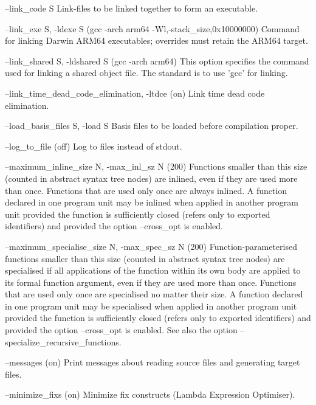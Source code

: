 \documentclass[12pt]{book}
\begin{document}
\begin{scriptcode}
--link_code S
     Link-files to be linked together to form an
     executable.

--link_exe S, -ldexe S (gcc -arch arm64 -Wl,-stack_size,0x10000000)
     Command for linking Darwin ARM64 executables; overrides
     must retain the ARM64 target.

--link_shared S, -ldshared S                 (gcc -arch arm64)
     This option specifies the command used for linking
     a shared object file. The standard is to use 'gcc' for
     linking.

--link_time_dead_code_elimination, -ltdce                 (on)
     Link time dead code elimination.

--load_basis_files S, -load S
     Basis files to be loaded before compilation
     proper.

--log_to_file                                            (off)
     Log to files instead of stdout.

--maximum_inline_size N, -max_inl_sz N                   (200)
     Functions smaller than this size (counted in abstract
     syntax tree nodes) are inlined, even if they are used
     more than once. Functions that are used only once are
     always inlined. A function declared in one program unit
     may be inlined when applied in another program unit
     provided the function is sufficiently closed (refers only
     to exported identifiers) and provided the option
     --cross_opt is enabled.

--maximum_specialise_size N, -max_spec_sz N              (200)
     Function-parameterised functions smaller than this size
     (counted in abstract syntax tree nodes) are specialised if
     all applications of the function within its own body are
     applied to its formal function argument, even if they are used
     more than once. Functions that are used only once are
     specialised no matter their size. A function declared in
     one program unit may be specialised when applied in
     another program unit provided the function is sufficiently
     closed (refers only to exported identifiers) and provided
     the option --cross_opt is enabled. See also the option
     --specialize_recursive_functions.

--messages                                                (on)
     Print messages about reading source files and generating
     target files.

--minimize_fixs                                           (on)
     Minimize fix constructs (Lambda Expression Optimiser).


\end{scriptcode}
\end{document}
